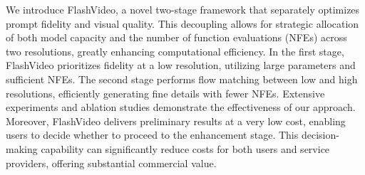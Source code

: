 We introduce FlashVideo, a novel two-stage framework that separately optimizes prompt fidelity and visual quality. This decoupling allows for strategic allocation of both model capacity and the number of function evaluations (NFEs) across two resolutions, greatly enhancing computational efficiency. In the first stage, FlashVideo prioritizes fidelity at a low resolution, utilizing large parameters and sufficient NFEs. The second stage performs flow matching between low and high resolutions, efficiently generating fine details with fewer NFEs. Extensive experiments and ablation studies demonstrate the effectiveness of our approach. Moreover, FlashVideo delivers preliminary results at a very low cost, enabling users to decide whether to proceed to the enhancement stage. This decision-making capability can significantly reduce costs for both users and service providers, offering substantial commercial value.
